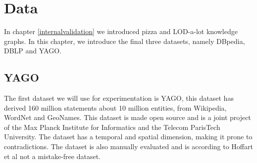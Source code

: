 \documentclass[11pt,letterpaper ,oneside ]{book}
\begin{document}
	\section{Data}

	In chapter \ref{internalvalidation} we introduced pizza and LOD-a-lot knowledge graphs. In this chapter, we introduce the final three datasets, namely DBpedia, DBLP and YAGO.
	
	\subsection{YAGO}
	The first dataset we will use for experimentation is YAGO\cite{YAGO2:2013}, this dataset has derived 160 million statements about 10 million entities, from Wikipedia, WordNet and GeoNames. This dataset is made open source and is a joint project of the Max Planck Institute for Informatics and the Telecom ParisTech University. The dataset has a temporal and spatial dimension, making it prone to contradictions. The dataset is also manually evaluated and is according to Hoffart et al\cite{YAGO2:2013} not a mistake-free dataset.
	
\end{document}
